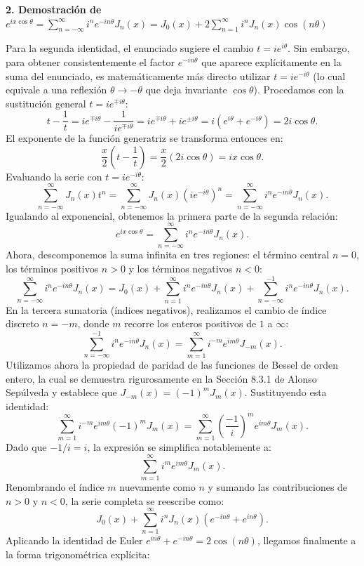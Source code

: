 \documentclass[a4paper]{article}
\begin{document}
\textbf{2. Demostración de $e^{ix\cos\theta}= \sum_{n=-\infty}^{\infty} i^n e^{-in\theta} J_n(x)= J_0(x)+2 \sum_{n=1}^{\infty} i^n J_n(x) \cos(n\theta)$}

Para la segunda identidad, el enunciado sugiere el cambio $t = i e^{i\theta}$. Sin embargo, para obtener consistentemente el factor $e^{-in\theta}$ que aparece explícitamente en la suma del enunciado, es matemáticamente más directo utilizar $t = i e^{-i\theta}$ (lo cual equivale a una reflexión $\theta \to -\theta$ que deja invariante $\cos\theta$). Procedamos con la sustitución general $t = i e^{\mp i\theta}$:
$$t - \frac{1}{t} = i e^{\mp i\theta} - \frac{1}{i e^{\mp i\theta}} = i e^{\mp i\theta} + i e^{\pm i\theta} = i\left(e^{i\theta} + e^{-i\theta}\right) = 2i\cos\theta.$$
El exponente de la función generatriz se transforma entonces en:
$$\frac{x}{2}\left(t - \frac{1}{t}\right) = \frac{x}{2}(2i\cos\theta) = ix\cos\theta.$$
Evaluando la serie con $t = i e^{-i\theta}$:
$$\sum_{n=-\infty}^{\infty} J_n(x) t^n = \sum_{n=-\infty}^{\infty} J_n(x) \left(i e^{-i\theta}\right)^n = \sum_{n=-\infty}^{\infty} i^n e^{-in\theta} J_n(x).$$
Igualando al exponencial, obtenemos la primera parte de la segunda relación:
$$e^{ix\cos\theta} = \sum_{n=-\infty}^{\infty} i^n e^{-in\theta} J_n(x).$$
Ahora, descomponemos la suma infinita en tres regiones: el término central $n=0$, los términos positivos $n>0$ y los términos negativos $n<0$:
$$\sum_{n=-\infty}^{\infty} i^n e^{-in\theta} J_n(x) = J_0(x) + \sum_{n=1}^{\infty} i^n e^{-in\theta} J_n(x) + \sum_{n=-\infty}^{-1} i^n e^{-in\theta} J_n(x).$$
En la tercera sumatoria (índices negativos), realizamos el cambio de índice discreto $n = -m$, donde $m$ recorre los enteros positivos de $1$ a $\infty$:
$$\sum_{n=-\infty}^{-1} i^n e^{-in\theta} J_n(x) = \sum_{m=1}^{\infty} i^{-m} e^{im\theta} J_{-m}(x).$$
Utilizamos ahora la propiedad de paridad de las funciones de Bessel de orden entero, la cual se demuestra rigurosamente en la Sección 8.3.1 de Alonso Sepúlveda y establece que $J_{-m}(x) = (-1)^m J_m(x)$. Sustituyendo esta identidad:
$$\sum_{m=1}^{\infty} i^{-m} e^{im\theta} (-1)^m J_m(x) = \sum_{m=1}^{\infty} \left(\frac{-1}{i}\right)^m e^{im\theta} J_m(x).$$
Dado que $-1/i = i$, la expresión se simplifica notablemente a:
$$\sum_{m=1}^{\infty} i^m e^{im\theta} J_m(x).$$
Renombrando el índice $m$ nuevamente como $n$ y sumando las contribuciones de $n>0$ y $n<0$, la serie completa se reescribe como:
$$J_0(x) + \sum_{n=1}^{\infty} i^n J_n(x) \left( e^{-in\theta} + e^{in\theta} \right).$$
Aplicando la identidad de Euler $e^{in\theta} + e^{-in\theta} = 2\cos(n\theta)$, llegamos finalmente a la forma trigonométrica explícita:
\end{document}
